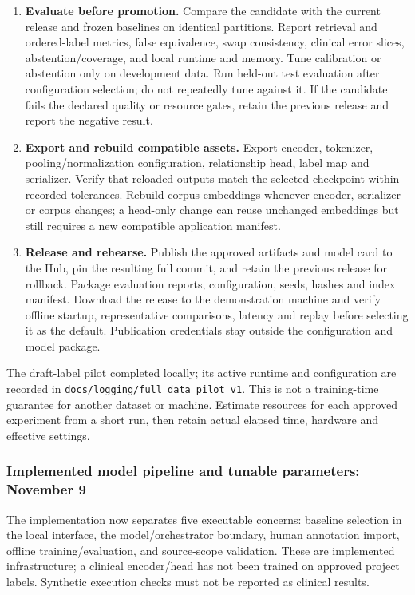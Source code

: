 \documentclass[10pt,letterpaper]{article}
\newcommand{\pathcode}[1]{\nolinkurl{#1}}
\begin{document}
\begin{enumerate}
an interrupted run from starting a new experiment. Repeat the final selected
configuration with at least three seeds and retain failures as well as gains.
\item \textbf{Evaluate before promotion.} Compare the candidate with the
current release and frozen baselines on identical partitions. Report
retrieval and ordered-label metrics, false equivalence, swap consistency,
clinical error slices, abstention/coverage, and local runtime and memory.
Tune calibration or abstention only on development data. Run held-out test
evaluation after configuration selection; do not repeatedly tune against it.
If the candidate fails the declared quality or resource gates, retain the
previous release and report the negative result.
\item \textbf{Export and rebuild compatible assets.} Export encoder,
tokenizer, pooling/normalization configuration, relationship head, label map
and serializer. Verify that reloaded outputs match the selected checkpoint
within recorded tolerances. Rebuild corpus embeddings whenever encoder,
serializer or corpus changes; a head-only change can reuse unchanged
embeddings but still requires a new compatible application manifest.
\item \textbf{Release and rehearse.} Publish the approved artifacts and
model card to the Hub, pin the resulting full commit, and retain the previous
release for rollback. Package evaluation reports, configuration, seeds,
hashes and index manifest. Download the release to the demonstration machine
and verify offline startup, representative comparisons, latency and replay
before selecting it as the default. Publication credentials stay outside
the configuration and model package.
\end{enumerate}

The draft-label pilot completed locally; its active runtime and configuration
are recorded in \pathcode{docs/logging/full_data_pilot_v1}. This is not a
training-time guarantee for another dataset or machine. Estimate resources
for each approved experiment from a short run, then retain actual elapsed
time, hardware and effective settings.

\subsubsection{Implemented model pipeline and tunable parameters: November 9}
\label{sec:implementedlearning}
The implementation now separates five executable concerns: baseline selection
in the local interface, the model/orchestrator boundary, human annotation
import, offline training/evaluation, and source-scope validation. These are
implemented infrastructure; a clinical encoder/head has not been trained on
approved project labels. Synthetic execution checks must not be reported as
clinical results.
\end{document}
